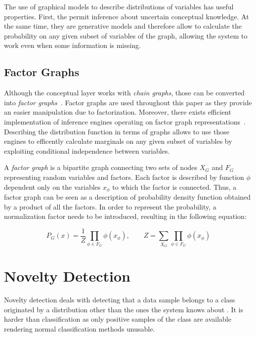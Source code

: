\documentclass[runningheads,a4paper]{llncs}
\begin{document}
The use of graphical models to describe distributions of variables has useful properties.
First, the permit inference about uncertain conceptual knowledge. At the same time, they are 
generative models and therefore allow to calculate the probability
on any given subset of variables of the graph, allowing the system to work even when some
information is missing.


\subsection{Factor Graphs}
Although the conceptual layer works with \emph{chain graphs}, those can be converted
into \emph{factor graphs}~\cite{kschischang2001factor}. Factor graphs are used throughout this paper as they provide an
easier manipulation due to factorization.
Moreover, there exists efficient implementation of inference engines operating on factor graph
representations~\cite{Mooij_libDAI_10}.
Describing the distribution function in terms of graphs allows to use those engines to
efficently calculate marginals on any given subset of variables by exploiting conditional
independence between variables.

A \emph{factor graph} is a bipartite graph connecting two sets of nodes $X_G$ and $F_G$
representing random variables and factors.
Each factor is described by function $\phi$ dependent only on the variables $x_\phi$
to which the factor is connected.
Thus, a factor graph can be seen as a description of probability density function obtained
by a product of all the factors. In order to represent the probability,
a normalization factor needs to be introduced, resulting in the following equation:

\begin{equation}
P_G(x) = \frac{1}{Z}\prod_{\phi \in F_G}{\phi(x_{\phi})},\qquad
Z = \sum_{X_G}\prod_{\phi \in F_G}{\phi(x_{\phi})}
\end{equation}


\section{Novelty Detection}
\label{sec:novelty-detection}
Novelty detection deals with detecting that a data sample belongs to a class
originated by a distribution other than the ones the system knows about \citep{markou2003novelty}.
It is harder than classification as only positive samples of the class are available
rendering normal classification methods unusable.
\end{document}
